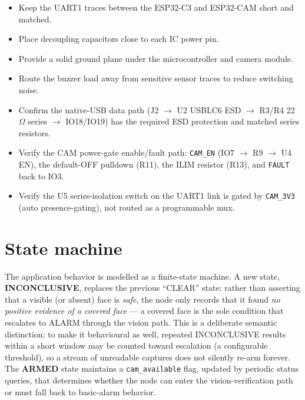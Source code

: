 \documentclass[11pt,a4paper]{article}
\begin{document}
\begin{itemize}
    \item Keep the UART1 traces between the ESP32-C3 and ESP32-CAM short and matched.
    \item Place decoupling capacitors close to each IC power pin.
    \item Provide a solid ground plane under the microcontroller and camera module.
    \item Route the buzzer load away from sensitive sensor traces to reduce switching noise.
    \item Confirm the native-USB data path (J2 $\rightarrow$ U2 USBLC6 ESD $\rightarrow$ R3/R4 22~$\Omega$ series $\rightarrow$ IO18/IO19) has the required ESD protection and matched series resistors.
    \item Verify the CAM power-gate enable/fault path: \texttt{CAM\_EN} (IO7 $\rightarrow$ R9 $\rightarrow$ U4 EN), the default-OFF pulldown (R11), the ILIM resistor (R13), and \texttt{FAULT} back to IO3.
    \item Verify the U5 series-isolation switch on the UART1 link is gated by \texttt{CAM\_3V3} (auto presence-gating), not routed as a programmable mux.
\end{itemize}

\section{State machine}
\label{sec:statemachine}

The application behavior is modelled as a finite-state machine.  A new state,
\textbf{INCONCLUSIVE}, replaces the previous ``CLEAR'' state: rather than
asserting that a visible (or absent) face is \emph{safe}, the node only records
that it found \emph{no positive evidence of a covered face} --- a covered face is
the sole condition that escalates to ALARM through the vision path.  This is a
deliberate semantic distinction; to make it behavioural as well, repeated
INCONCLUSIVE results within a short window may be counted toward escalation (a
configurable threshold), so a stream of unreadable captures does not silently
re-arm forever.  The \textbf{ARMED} state maintains a \texttt{cam\_available}
flag, updated by periodic status queries, that determines whether the node can
enter the vision-verification path or must fall back to basic-alarm behavior.
\end{document}
